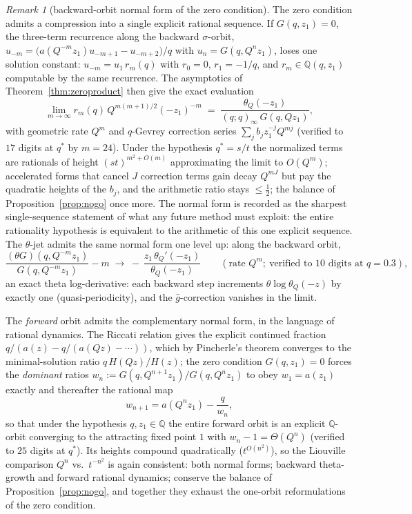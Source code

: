 \documentclass[11pt]{article}
\theoremstyle{plain}
\theoremstyle{definition}
\theoremstyle{remark}
\newtheorem{remark}[theorem]{Remark}
\newcommand{\Q}{\mathbb{Q}}
\begin{document}
\begin{remark}[backward-orbit normal form of the zero condition]
\label{rem:backward}
The zero condition admits a compression into a single explicit rational sequence. If $G(q,z_1)=0$,
the three-term recurrence along the backward $\sigma$-orbit, $u_{-m}=\bigl(a(Q^{-m}z_1)u_{-m+1}
-u_{-m+2}\bigr)/q$ with $u_n=G(q,Q^nz_1)$, loses one solution constant: $u_{-m}=u_1\,r_m(q)$ with
$r_0=0$, $r_1=-1/q$, and $r_m\in\Q(q,z_1)$ computable by the same recurrence. The asymptotics of
Theorem~\ref{thm:zeroproduct} then give the exact evaluation
\[
   \lim_{m\to\infty} r_m(q)\,Q^{m(m+1)/2}(-z_1)^{-m}
   \;=\;\frac{\theta_Q(-z_1)}{(q;q)_\infty\,G(q,Qz_1)},
\]
with geometric rate $Q^m$ and $q$-Gevrey correction series $\sum_jb_jz_1^{-j}Q^{mj}$ (verified to
$17$ digits at $q^\ast$ by $m=24$). Under the hypothesis $q^\ast=s/t$ the normalized terms are
rationals of height $(st)^{m^2+O(m)}$ approximating the limit to $O(Q^m)$; accelerated forms that
cancel $J$ correction terms gain decay $Q^{mJ}$ but pay the quadratic heights of the $b_j$, and the
arithmetic ratio stays $\le\tfrac12$; the balance of Proposition~\ref{prop:nogo} once more. The
normal form is recorded as the sharpest single-sequence statement of what any future method must
exploit: the entire rationality hypothesis is equivalent to the arithmetic of this one explicit
sequence. The $\theta$-jet admits the same normal form one level up: along the backward orbit,
\[
   \frac{(\theta G)(q,Q^{-m}z_1)}{G(q,Q^{-m}z_1)}-m
   \;\longrightarrow\;
   -\,\frac{z_1\,\theta_Q'(-z_1)}{\theta_Q(-z_1)}
   \qquad(\text{rate }Q^m;\ \text{verified to }10\text{ digits at }q=0.3),
\]
an exact theta log-derivative: each backward step increments $\theta\log\theta_Q(-z)$ by exactly one
(quasi-periodicity), and the $\hat g$-correction vanishes in the limit.

The \emph{forward} orbit admits the complementary normal form, in the language of rational dynamics.
The Riccati relation gives the explicit continued fraction
$q/(a(z)-q/(a(Qz)-\cdots))$, which by Pincherle's theorem \cite{LorentzenWaadeland1992} converges to the minimal-solution ratio
$q\,H(Qz)/H(z)$; the zero condition $G(q,z_1)=0$ forces the \emph{dominant} ratios
$w_n:=G(q,Q^{n+1}z_1)/G(q,Q^nz_1)$ to obey $w_1=a(z_1)$ exactly and thereafter the rational map
\[
   w_{n+1}=a(Q^nz_1)-\frac{q}{w_n},
\]
so that under the hypothesis $q,z_1\in\Q$ the entire forward orbit is an explicit $\Q$-orbit
converging to the attracting fixed point $1$ with $w_n-1=\Theta(Q^n)$ (verified to $25$ digits at
$q^\ast$). Its heights compound quadratically ($t^{O(n^2)}$), so the Liouville comparison
$Q^n$ vs.\ $t^{-n^2}$ is again consistent: both normal forms; backward theta-growth and forward
rational dynamics; conserve the balance of Proposition~\ref{prop:nogo}, and together they exhaust
the one-orbit reformulations of the zero condition.


\end{remark}
\end{document}
